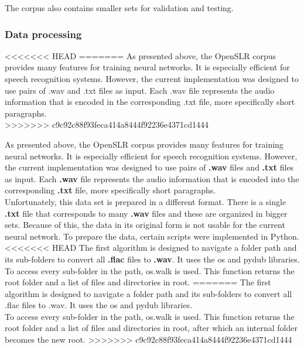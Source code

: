 The corpus also contains smaller sets for validation and testing.\\

\subsubsection{Data processing}
<<<<<<< HEAD
=======
As presented above, the OpenSLR corpus provides many features for training neural networks. It is especially efficient for speech recognition systems. However, the current implementation was designed to use pairs of .wav and .txt files as input. Each .wav file represents the audio information that is encoded in the corresponding .txt file, more specifically short paragraphs.\\
>>>>>>> c9c92c88f93feca414a8444f92236e4371cd1444

As presented above, the OpenSLR corpus provides many features for training neural networks. It is especially efficient for speech recognition systems. However, the current implementation was designed to use pairs of \textbf{.wav} files and \textbf{.txt} files as input. Each \textbf{.wav} file represents the audio information that is encoded into the corresponding \textbf{.txt} file, more specifically short paragraphs.\\

Unfortunately, this data set is prepared in a different format. There is a single \textbf{.txt} file that corresponds to many \textbf{.wav} files and these are organized in bigger sets. Because of this, the data in its original form is not usable for the current neural network. To prepare the data, certain scripts were implemented in Python.\\

<<<<<<< HEAD
The first algorithm is designed to navigate a folder path and its sub-folders to convert all \textbf{.flac} files to \textbf{.wav}. It uses the os and pydub libraries. 
To access every sub-folder in the path, os.walk is used. This function returns the root folder and a list of files and directories in root. 
=======
The first algorithm is designed to navigate a folder path and its sub-folders to convert all .flac files to .wav. It uses the os and pydub libraries.  \\
To access every sub-folder in the path, os.walk is used. This function returns the root folder and a list of files and directories in root, after which an internal folder becomes the new root.
>>>>>>> c9c92c88f93feca414a8444f92236e4371cd1444

